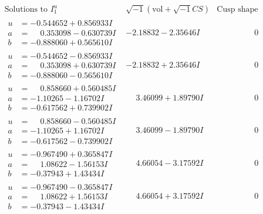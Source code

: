 \documentclass[1p]{elsarticle_modified}
\theoremstyle{definition}
\newcommand{\I}{\sqrt{-1}}
\begin{document}
$$\begin{array}{c|c|c}  
\text{Solutions to }I^u_{1}& \I (\text{vol} + \sqrt{-1}CS) & \text{Cusp shape}\\
 \hline 
\begin{aligned}
u &= -0.544652 + 0.856933 I \\
a &= \phantom{-}0.353098 - 0.630739 I \\
b &= -0.888060 + 0.565610 I\end{aligned}
 & -2.18832 - 2.35646 I & \phantom{-0.000000 } 0 \\ \hline\begin{aligned}
u &= -0.544652 - 0.856933 I \\
a &= \phantom{-}0.353098 + 0.630739 I \\
b &= -0.888060 - 0.565610 I\end{aligned}
 & -2.18832 + 2.35646 I & \phantom{-0.000000 } 0 \\ \hline\begin{aligned}
u &= \phantom{-}0.858660 + 0.560485 I \\
a &= -1.10265 - 1.16702 I \\
b &= -0.617562 + 0.739902 I\end{aligned}
 & \phantom{-}3.46099 + 1.89790 I & \phantom{-0.000000 } 0 \\ \hline\begin{aligned}
u &= \phantom{-}0.858660 - 0.560485 I \\
a &= -1.10265 + 1.16702 I \\
b &= -0.617562 - 0.739902 I\end{aligned}
 & \phantom{-}3.46099 - 1.89790 I & \phantom{-0.000000 } 0 \\ \hline\begin{aligned}
u &= -0.967490 + 0.365847 I \\
a &= \phantom{-}1.08622 - 1.56153 I \\
b &= -0.37943 + 1.43434 I\end{aligned}
 & \phantom{-}4.66054 - 3.17592 I & \phantom{-0.000000 } 0 \\ \hline\begin{aligned}
u &= -0.967490 - 0.365847 I \\
a &= \phantom{-}1.08622 + 1.56153 I \\
b &= -0.37943 - 1.43434 I\end{aligned}
 & \phantom{-}4.66054 + 3.17592 I & \phantom{-0.000000 } 0 \\ \hline\begin{aligned}

\end{aligned}
\end{array}$$
\end{document}
